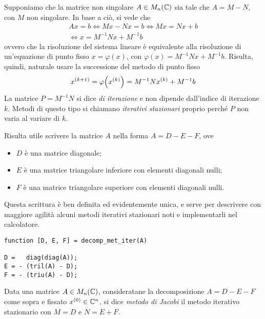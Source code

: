 	\noindent Supponiamo che la matrice non singolare \(A \in M_n (\mathbb{C})\) sia tale che \(A = M - N\), con \(M\) non singolare. In base a ciò, si vede che
	\begin{multline*}
		A x = b \iff M x - N x = b \iff M x = N x + b \\
		\iff x = M^{-1} N x + M^{-1} b
	\end{multline*}
	ovvero che la risoluzione del sistema lineare è equivalente alla risoluzione di un'equazione di punto fisso \(x = \varphi (x)\), con \(\varphi (x) = M^{-1} N x + M^{-1} b\). Risulta, quindi, naturale usare la successione del metodo di punto fisso
	\begin{equation}\label{eq:metodo-punto-fisso}
		x^{(k + 1)} = \varphi \qty(x^{(k)}) = M^{-1} N x^{(k)} + M^{-1} b
	\end{equation}
	La matrice \(P = M^{-1} N\) si dice \emph{di iterazione} e non dipende dall'indice di iterazione \(k\). Metodi di questo tipo si chiamano \emph{iterativi stazionari} proprio perché \(P\) non varia al variare di \(k\).
	
	Risulta utile scrivere la matrice \(A\) nella forma \(A = D - E - F\), ove
		\begin{itemize}
			\item \(D\) è una matrice diagonale;
			\item \(E\) è una matrice triangolare inferiore con elementi diagonali nulli;
			\item \(F\) è una matrice triangolare superiore con elementi diagonali nulli.
		\end{itemize}
	Questa scrittura è ben definita ed evidentemente unica, e serve per descrivere con maggiore agilità alcuni metodi iterativi stazionari noti e implementarli nel calcolatore.
	
	\begin{lstlisting}[style=Matlab-editor, float=tp, frame=lines, caption={Implementazione della decomposizione \(A = D - E - F\).}, label=cod:decomp-def]
function [D, E, F] = decomp_met_iter(A)

D =   diag(diag(A));
E = - (tril(A) - D); 
F = - (triu(A) - D);
	\end{lstlisting}

	\begin{definizione}\label{def:metodo-jacobi}
		Data una matrice \(A \in M_n (\mathbb{C})\), consideratane la decomposizione \(A = D - E - F\) come sopra e fissato \(x^{(0)} \in \mathbb{C}^n\), si dice \emph{metodo di Jacobi} il metodo iterativo stazionario con \(M = D\) e \(N = E + F\).
	\end{definizione}

